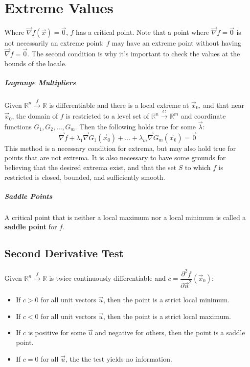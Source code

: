 \documentclass[11pt]{article}
\begin{document}
\section{Extreme Values}
	Where $\vec{\nabla} f(\vec{x}) = \vec{0}$, $f$ has a critical point. Note that a point where $\vec{\nabla} f = \vec{0}$ is not necessarily an extreme point: $f$ may have an extreme point without having $\vec{\nabla} f = \vec{0}$. The second condition is why it's important to check the values at the bounds of the locale.
	
	\subparagraph{Lagrange Multipliers} Given $\mathbb{R}^n \xrightarrow{f} \mathbb{R}$ is differentiable and there is a local extreme at $\vec{x}_0$, and that near $\vec{x}_0$, the domain of $f$ is restricted to a level set of $\mathbb{R}^n \xrightarrow{G} \mathbb{R}^m$ and coordinate functions $G_1, G_2, \ldots , G_m$. Then the following holds true for some $\vec{\lambda}$:
	\begin{equation}
		\vec{\nabla} f + \lambda_1 \vec{\nabla} G_1(\vec{x}_0) + \ldots + \lambda_m \vec{\nabla} G_m(\vec{x}_0) = \vec{0}
	\end{equation}
	This method is a necessary condition for extrema, but may also hold true for points that are not extrema. It is also necessary to have some grounds for believing that the desired extrema exist, and that the set $S$ to which $f$ is restricted is closed, bounded, and sufficiently smooth.
	
	\subparagraph{Saddle Points} A critical point that is neither a local maximum nor a local minimum is called a \textbf{saddle point} for $f$.
	
	\subsection{Second Derivative Test}
		Given $\mathbb{R}^n \xrightarrow{f} \mathbb{R}$ is twice continuously differentiable and $c = \dfrac{\partial^2 f}{\partial \vec{u}^2} (\vec{x}_0)$:
		\begin{itemize}
			\item If $c > 0$ for all unit vectors $\vec{u}$, then the point is a strict local minimum.
			\item If $c < 0$ for all unit vectors $\vec{u}$, then the point is a strict local maximum.
			\item If $c$ is positive for some $\vec{u}$ and negative for others, then the point is a saddle point.
			\item If $c = 0$ for all $\vec{u}$, the the test yields no information.
		\end{itemize}
		
\end{document}
